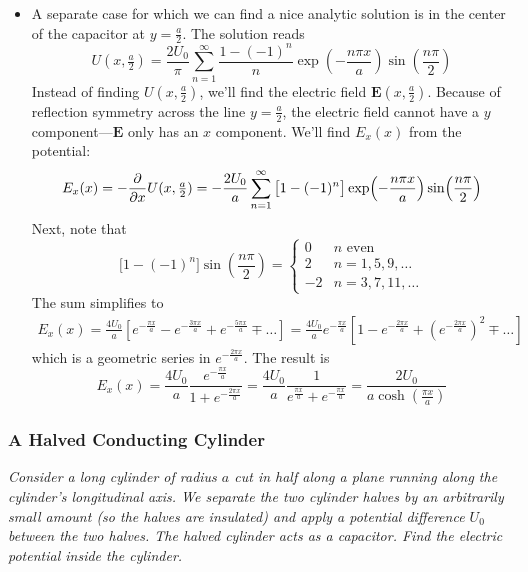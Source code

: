 \documentclass[11pt, a4paper]{article}
\renewcommand{\vec}[1]{\bm{#1}} %
\newcommand{\E}{\vec{E}}  %
\begin{document}
\begin{itemize}
	\item A separate case for which we can find a nice analytic solution is in the center of the capacitor at $ y = \frac{a}{2} $. The solution reads
	\begin{equation*}
		U(x, \tfrac{a}{2}) = \frac{2U_{0}}{\pi} \sum_{n = 1}^{\infty}\frac{1 - (-1)^{n}}{n}\exp(-\frac{n\pi x}{a}) \sin(\frac{n\pi}{2})
	\end{equation*}
	Instead of finding $ U(x, \tfrac{a}{2}) $, we'll find the electric field $ \E(x, \tfrac{a}{2}) $. Because of reflection symmetry across the line $ y = \frac{a}{2} $, the electric field cannot have a $ y $ component---$ \E $ only has an $ x $ component. We'll find $ E_{x}(x) $ from the potential:
	\begin{equation*}
		E_{x}(x) = -\pdv{}{x}U(x, \tfrac{a}{2}) = -\frac{2U_{0}}{a} \sum_{n = 1}^{\infty}\big[1 - (-1)^{n}\big]\exp(-\frac{n\pi x}{a}) \sin(\frac{n\pi}{2})
	\end{equation*}
	Next, note that
	\begin{equation*}
		\big[1 - (-1)^{n}\big]\sin(\frac{n\pi}{2}) = 
		\begin{cases}
			0 & n \text{ even}\\
			2 & n = 1, 5, 9, \ldots\\
			- 2 & n = 3, 7, 11, \ldots
		\end{cases}
	\end{equation*}
	The sum simplifies to
	\begin{align*}
		E_{x}(x) = \frac{4U_{0}}{a}\left[e^{-\frac{\pi x}{a}} - e^{-\frac{3\pi x}{a}} + e^{-\frac{5\pi x}{a}} \mp \ldots \right] = \frac{4U_{0}}{a}e^{-\frac{\pi x}{a}}\left[1 - e^{-\frac{2\pi x}{a}} + \left(e^{-\frac{2\pi x}{a}}\right)^{2}\mp \ldots \right]
	\end{align*}
	which is a geometric series in $ e^{-\frac{2\pi x}{a}} $. The result is
	\begin{equation*}
		E_{x}(x) =  \frac{4U_{0}}{a}\frac{e^{-\frac{\pi x}{a}}}{1 + e^{-\frac{2\pi x}{a}}} = \frac{4U_{0}}{a}\frac{1}{e^{\frac{\pi x}{a}} + e^{-\frac{\pi x}{a}}} = \frac{2U_{0}}{a\cosh(\frac{\pi x}{a})}
	\end{equation*}
\end{itemize}

\subsubsection{A Halved Conducting Cylinder}
\textit{Consider a long cylinder of radius $ a $ cut in half along a plane running along the cylinder's longitudinal axis. We separate the two cylinder halves by an arbitrarily small amount (so the halves are insulated) and apply a potential difference $ U_{0} $ between the two halves. The halved cylinder acts as a capacitor. Find the electric potential inside the cylinder.}
\end{document}
